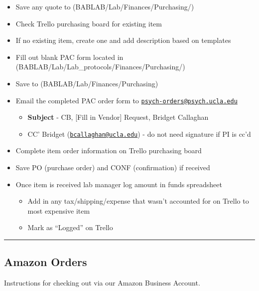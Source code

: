 \documentclass[]{book}
\providecommand{\tightlist}{%
  \setlength{\itemsep}{0pt}\setlength{\parskip}{0pt}}
\begin{document}
\begin{itemize}
\tightlist
\item
  Save any quote to (BABLAB/Lab/Finances/Purchasing/)
\item
  Check Trello purchasing board for existing item
\item
  If no existing item, create one and add description based on templates
\item
  Fill out blank PAC form located in (BABLAB/Lab/Lab\_protocols/Finances/Purchasing/)
\item
  Save to (BABLAB/Lab/Finances/Purchasing)
\item
  Email the completed PAC order form to \href{mailto:psych-orders@psych.ucla.edu}{\nolinkurl{psych-orders@psych.ucla.edu}}

  \begin{itemize}
  \tightlist
  \item
    \textbf{Subject} - CB, {[}Fill in Vendor{]} Request, Bridget Callaghan
  \item
    CC' Bridget (\href{mailto:bcallaghan@ucla.edu}{\nolinkurl{bcallaghan@ucla.edu}}) - do not need signature if PI is cc'd
  \end{itemize}
\item
  Complete item order information on Trello purchasing board
\item
  Save PO (purchase order) and CONF (confirmation) if received
\item
  Once item is received lab manager log amount in funds spreadsheet

  \begin{itemize}
  \tightlist
  \item
    Add in any tax/shipping/expense that wasn't accounted for on Trello to most expensive item
  \item
    Mark as ``Logged'' on Trello
  \end{itemize}
\end{itemize}

\begin{center}\rule{0.5\linewidth}{\linethickness}\end{center}

\hypertarget{amazon-orders}{%
\subsection{Amazon Orders}\label{amazon-orders}}

Instructions for checking out via our Amazon Business Account.
\end{document}
